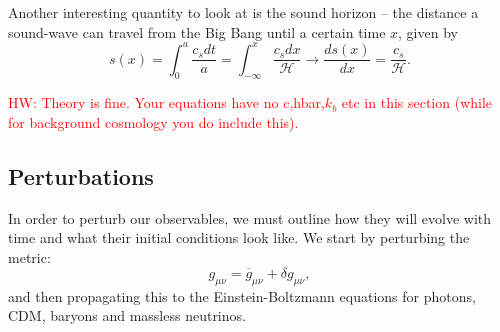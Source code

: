 \documentclass{aa}
\newcommand{\hw}[1]{\textcolor{red}{HW: #1}}
\begin{document}
Another interesting quantity to look at is the sound horizon -- the distance a sound-wave can travel from the Big Bang until a certain time $x$, given by
\begin{equation}
    s(x) = \int_0^{a} \frac{c_s dt}{a} = \int_{-\infty}^{x} \frac{c_s dx}{\mathcal{H}} \to \frac{ds(x)}{dx} = \frac{c_s}{\mathcal{H}}.
\end{equation}

\hw{Theory is fine. Your equations have no c,hbar,$k_b$ etc in this section (while for background cosmology you do include this).}

\subsection{Perturbations}

In order to perturb our observables, we must outline how they will evolve with time and what their initial conditions look like. We start by perturbing the metric:
\begin{equation}
g_{\mu\nu} = \overline{g}_{\mu\nu} + \delta g_{\mu\nu},
\end{equation}
and then propagating this to the Einstein-Boltzmann equations for photons, CDM, baryons and massless neutrinos.
\end{document}
